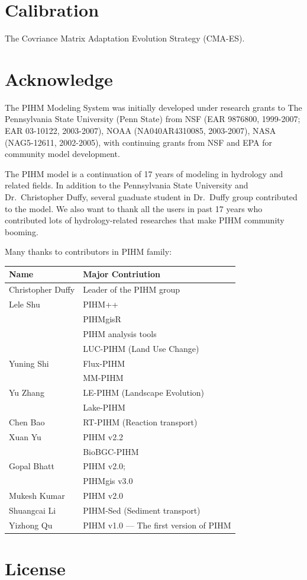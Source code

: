 \documentclass[]{scrbook}
\begin{document}
\chapter{Calibration}\label{calibration}

The Covriance Matrix Adaptation Evolution Strategy (CMA-ES).

\chapter*{Acknowledge}\label{acknowledge}

The PIHM Modeling System was initially developed under research grants
to The Pennsylvania State University (Penn State) from NSF (EAR 9876800,
1999-2007; EAR 03-10122, 2003-2007), NOAA (NA040AR4310085, 2003-2007),
NASA (NAG5-12611, 2002-2005), with continuing grants from NSF and EPA
for community model development.

The PIHM model is a continuation of 17 years of modeling in hydrology
and related fields. In addition to the Pennsylvania State University and
Dr.~Christopher Duffy, several guaduate student in Dr.~Duffy group
contributed to the model. We also want to thank all the users in past 17
years who contributed lots of hydrology-related researches that make
PIHM community booming.

Many thanks to contributors in PIHM family:

\begin{longtable}[]{@{}ll@{}}
\toprule
Name & Major Contriution\tabularnewline
\midrule
\endhead
Christopher Duffy & Leader of the PIHM group\tabularnewline
Lele Shu & PIHM++\tabularnewline
& PIHMgisR\tabularnewline
& PIHM analysis tools\tabularnewline
& LUC-PIHM (Land Use Change)\tabularnewline
Yuning Shi & Flux-PIHM\tabularnewline
& MM-PIHM\tabularnewline
Yu Zhang & LE-PIHM (Landscape Evolution)\tabularnewline
& Lake-PIHM\tabularnewline
Chen Bao & RT-PIHM (Reaction transport)\tabularnewline
Xuan Yu & PIHM v2.2\tabularnewline
& BioBGC-PIHM\tabularnewline
Gopal Bhatt & PIHM v2.0;\tabularnewline
& PIHMgis v3.0\tabularnewline
Mukesh Kumar & PIHM v2.0\tabularnewline
Shuangcai Li & PIHM-Sed (Sediment transport)\tabularnewline
Yizhong Qu & PIHM v1.0 --- The first version of PIHM\tabularnewline
\bottomrule
\end{longtable}

\chapter*{License}\label{license}
\end{document}
